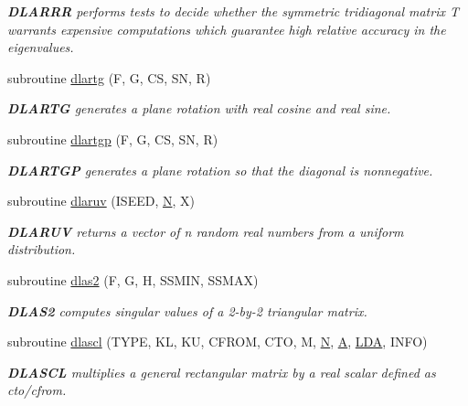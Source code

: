 \begin{DoxyCompactItemize}
\begin{DoxyCompactList}\small\item\em {\bfseries D\+L\+A\+R\+R\+R} performs tests to decide whether the symmetric tridiagonal matrix T warrants expensive computations which guarantee high relative accuracy in the eigenvalues. \end{DoxyCompactList}\item 
subroutine \hyperlink{group__auxOTHERauxiliary_ga73cdfda601476bb0fdd86047dee1d357}{dlartg} (F, G, C\+S, S\+N, R)
\begin{DoxyCompactList}\small\item\em {\bfseries D\+L\+A\+R\+T\+G} generates a plane rotation with real cosine and real sine. \end{DoxyCompactList}\item 
subroutine \hyperlink{group__auxOTHERauxiliary_gac216c77dadbc793b5f0697555af0775b}{dlartgp} (F, G, C\+S, S\+N, R)
\begin{DoxyCompactList}\small\item\em {\bfseries D\+L\+A\+R\+T\+G\+P} generates a plane rotation so that the diagonal is nonnegative. \end{DoxyCompactList}\item 
subroutine \hyperlink{group__auxOTHERauxiliary_ga55e7c02e398f2c6365c956d272836a89}{dlaruv} (I\+S\+E\+E\+D, \hyperlink{polmisc_8c_a0240ac851181b84ac374872dc5434ee4}{N}, X)
\begin{DoxyCompactList}\small\item\em {\bfseries D\+L\+A\+R\+U\+V} returns a vector of n random real numbers from a uniform distribution. \end{DoxyCompactList}\item 
subroutine \hyperlink{group__auxOTHERauxiliary_ga307400bc17cbe31b5b8827a2802efae4}{dlas2} (F, G, H, S\+S\+M\+I\+N, S\+S\+M\+A\+X)
\begin{DoxyCompactList}\small\item\em {\bfseries D\+L\+A\+S2} computes singular values of a 2-\/by-\/2 triangular matrix. \end{DoxyCompactList}\item 
subroutine \hyperlink{group__auxOTHERauxiliary_ga7bce4c35ec5a86ee0bfdd15c476d99c8}{dlascl} (T\+Y\+P\+E, K\+L, K\+U, C\+F\+R\+O\+M, C\+T\+O, M, \hyperlink{polmisc_8c_a0240ac851181b84ac374872dc5434ee4}{N}, \hyperlink{classA}{A}, \hyperlink{example__user_8c_ae946da542ce0db94dced19b2ecefd1aa}{L\+D\+A}, I\+N\+F\+O)
\begin{DoxyCompactList}\small\item\em {\bfseries D\+L\+A\+S\+C\+L} multiplies a general rectangular matrix by a real scalar defined as cto/cfrom. \end{DoxyCompactList}\item 

\end{DoxyCompactItemize}
